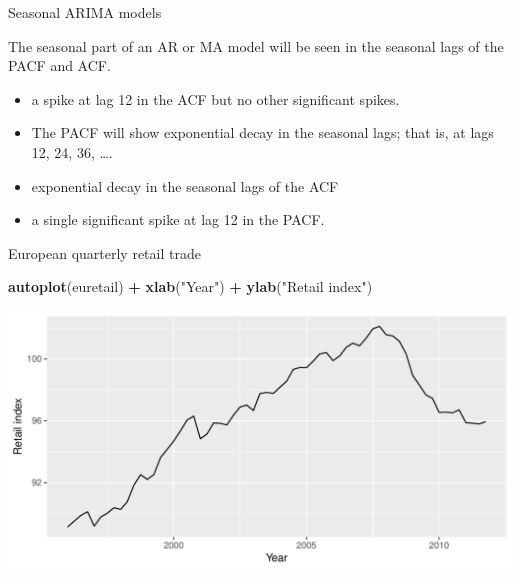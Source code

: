 \documentclass[14pt,ignorenonframetext,]{beamer}
\newenvironment{Shaded}{\begin{snugshade}}{\end{snugshade}}
\newcommand{\KeywordTok}[1]{\textcolor[rgb]{0.13,0.29,0.53}{\textbf{#1}}}
\newcommand{\StringTok}[1]{\textcolor[rgb]{0.31,0.60,0.02}{#1}}
\newcommand{\OperatorTok}[1]{\textcolor[rgb]{0.81,0.36,0.00}{\textbf{#1}}}
\newcommand{\NormalTok}[1]{#1}
\providecommand{\tightlist}{%
  \setlength{\itemsep}{0pt}\setlength{\parskip}{0pt}}
\begin{document}
\begin{frame}{Seasonal ARIMA models}

The seasonal part of an AR or MA model will be seen in the seasonal lags
of the PACF and ACF.


\begin{itemize}
\tightlist
\item
  a spike at lag 12 in the ACF but no other significant spikes.
\item
  The PACF will show exponential decay in the seasonal lags; that is, at
  lags 12, 24, 36, \dots.
\end{itemize}


\begin{itemize}
\tightlist
\item
  exponential decay in the seasonal lags of the ACF
\item
  a single significant spike at lag 12 in the PACF.
\end{itemize}

\end{frame}

\begin{frame}[fragile]{European quarterly retail trade}

\begin{Shaded}
\begin{Highlighting}[]
\KeywordTok{autoplot}\NormalTok{(euretail) }\OperatorTok{+}
\StringTok{  }\KeywordTok{xlab}\NormalTok{(}\StringTok{"Year"}\NormalTok{) }\OperatorTok{+}\StringTok{ }\KeywordTok{ylab}\NormalTok{(}\StringTok{"Retail index"}\NormalTok{)}
\end{Highlighting}
\end{Shaded}

\includegraphics{week_5_arima_files/figure-beamer/unnamed-chunk-42-1.pdf}

\end{frame}
\end{document}

